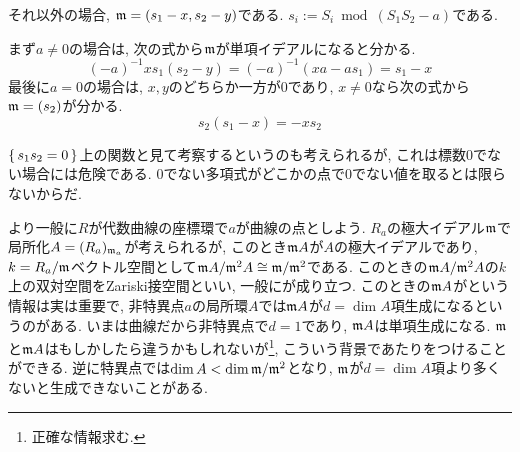 \begin{egans}
それ以外の場合, $\mathfrak{m} = (s_1 - x, s_2 - y)$である. $s_i := S_i \bmod{(S_1S_2 - a)}$である.\par
まず$a\neq 0$の場合は, 次の式から$\mathfrak{m}$が単項イデアルになると分かる.
\[(-a)^{-1} xs_1(s_2 - y) =(-a)^{-1}(xa - as_1) = s_1 - x\]
最後に$a=0$の場合は, $x,y$のどちらか一方が0であり, $x\neq 0$なら次の式から$\mathfrak{m} = (s_2)$が分かる.
\[s_2(s_1 - x) = - x s_2\]
\end{egans}

\begin{rem}
$\set{s_1s_2 = 0}$上の関数と見て考察するというのも考えられるが, これは標数0でない場合には危険である. $0$でない多項式がどこかの点で0でない値を取るとは限らないからだ.
\end{rem}

\begin{tips} より一般に$R$が代数曲線の座標環で$a$が曲線の点としよう. $R_{a}$の極大イデアル$\mathfrak{m}$で局所化$A = (R_a)_{\mathfrak{m}_{a}}$が考えられるが, このとき$\mathfrak{m}A$が$A$の極大イデアルであり, $k=R_a/\mathfrak{m}$ベクトル空間として$\mathfrak{m}A / \mathfrak{m}^2A \cong \mathfrak{m}/\mathfrak{m}^2$である. このときの$\mathfrak{m}A/\mathfrak{m}^2A$の$k$上の双対空間をZariski接空間といい, 一般にが成り立つ.  このときの$\mathfrak{m}A$がという情報は実は重要で, 非特異点$a$の局所環$A$では$\mathfrak{m}A$が$d=\dim{A}$項生成になるというのがある. いまは曲線だから非特異点で$d=1$であり, $\mathfrak{m}A$は単項生成になる. $\mathfrak{m}$と$\mathfrak{m}A$はもしかしたら違うかもしれないが\footnote{正確な情報求む.}, こういう背景であたりをつけることができる. 逆に特異点では$\dim{A} < \dim{\mathfrak{m}/\mathfrak{m}^2}$となり, $\mathfrak{m}$が$d=\dim{A}$項より多くないと生成できないことがある.
\end{tips}




















